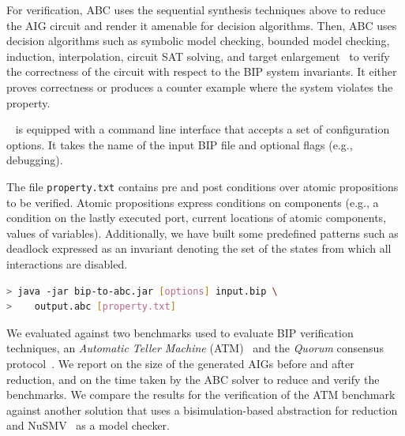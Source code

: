 

For verification, 
ABC uses the sequential synthesis techniques above to reduce the 
AIG circuit and render it amenable for decision algorithms. 
Then, ABC uses decision algorithms such as 
symbolic model checking, bounded model checking, induction, 
interpolation, circuit SAT solving, 
and target enlargement~\cite{MoGS00,MoMZ01,HoSH00,BaKuAb02,Hari05expert}
to verify the correctness of the circuit with respect to the BIP system invariants. 
It either proves correctness or produces a counter example where the system violates the property. 




\biptool~ is equipped with a command line interface that accepts a set 
of configuration options. 
It takes the name of the input BIP file and optional flags (e.g., debugging).
 
The file \texttt{property.txt} contains pre and post conditions over atomic propositions to be verified. Atomic propositions express conditions on components (e.g., a condition on the lastly executed port, current locations of atomic components, values of variables). Additionally, we have built some predefined patterns such as deadlock expressed as an invariant denoting the set of the states from which all interactions are disabled.

\begin{lstlisting}[language=Bash]
> java -jar bip-to-abc.jar [options] input.bip \
>    output.abc [property.txt]
\end{lstlisting}

We evaluated \biptool{} against two benchmarks used to evaluate BIP verification techniques, 
an {\em Automatic Teller Machine} (ATM)~\cite{atm} and the {\em Quorum} consensus
protocol~\cite{guerraoui2012speculative}. We report on the size of the generated
AIGs before and after reduction, and on the time taken by the ABC solver to 
reduce and verify the benchmarks. We compare the results for the 
verification of the ATM benchmark against another solution that uses a bisimulation-based abstraction for reduction \cite{facs14} and NuSMV~\cite{nusmv} as a model checker. 
%
